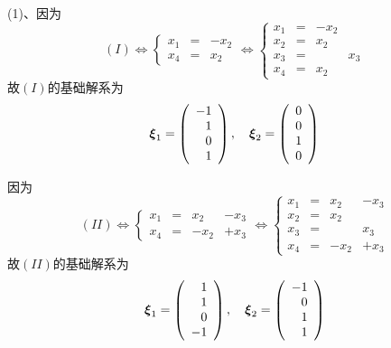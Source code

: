 \begin{frame}
\begin{jie}
  (1)、因为
    $$
    (I) \Longleftrightarrow
    \left\{
      \begin{array}{rcr}
        x_1&=&-x_2\\[0.05in]
        x_4&=&x_2
      \end{array}
    \right. \Longleftrightarrow
    \left\{
      \begin{array}{rcrr}
        x_1&=&-x_2&\\[0.05in]
        x_2&=&x_2&\\[0.05in]
        x_3&=&&x_3\\[0.05in]
        x_4&=&x_2&
      \end{array}
    \right. 
    $$   
    故$(I)$的基础解系为
    $$
    \boldsymbol{\xi}_1=\left(
      \begin{array}{r}
        -1\\1\\0\\1
      \end{array}
    \right), \quad
    \boldsymbol{\xi}_2=\left(
      \begin{array}{r}
        0\\0\\1\\0
      \end{array}
    \right)
    $$
  \end{jie}
  \end{frame}

\begin{frame}
\begin{jie}[续]
  因为
  $$
  (II) \Longleftrightarrow
  \left\{
    \begin{array}{rcrr}
      x_1&=&x_2&-x_3\\[0.05in]
      x_4&=&-x_2&+x_3
    \end{array}
  \right. \Longleftrightarrow
  \left\{
    \begin{array}{rcrr}
      x_1&=&x_2&-x_3\\[0.05in]
      x_2&=&x_2&\\[0.05in]
      x_3&=&&x_3\\[0.05in]
      x_4&=&-x_2&+x_3
    \end{array}
  \right. 
  $$
  故$(II)$的基础解系为
  $$
  \boldsymbol{\xi}_1=\left(
    \begin{array}{r}
      1\\1\\0\\-1
    \end{array}
  \right), \quad
  \boldsymbol{\xi}_2=\left(
    \begin{array}{r}
      -1\\0\\1\\1
    \end{array}
  \right)
  $$
\end{jie}
\end{frame}

